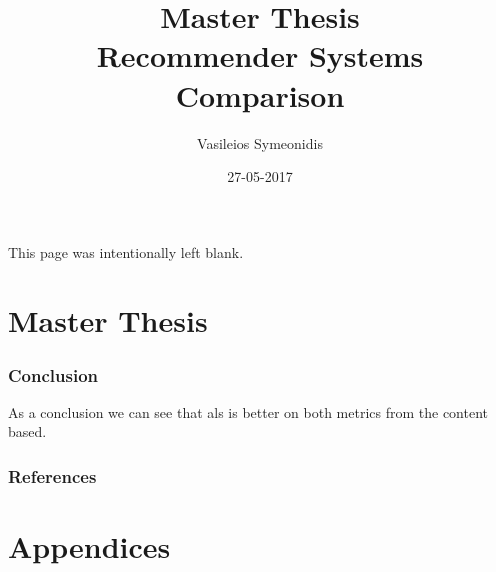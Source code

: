 \documentclass{article}
\title{Master Thesis \\ Recommender Systems Comparison}
\date{27-05-2017}
\author{Vasileios Symeonidis}
\begin{document}
\maketitle
{}
\newpage
\tableofcontents
{}
\newpage
{}
\begin{center}
This page was intentionally left blank.
\end{center}
\newpage
{}

\part{Master Thesis}





\section{Conclusion}
As a conclusion we can see that als is better on both metrics from the content based.

\newpage
\section{References}



\newpage
\appendix
\part{Appendices}








%	
%	
\end{document}
